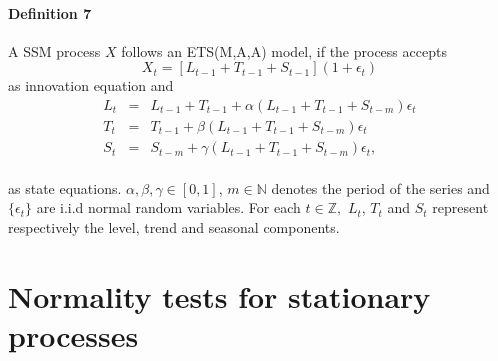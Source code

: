 \hypertarget{definition-7}{%
\paragraph{Definition 7}\label{definition-7}}

A SSM process \(X\) follows an ETS(M,A,A) model, if the process accepts\\
\[
X_t = [L_{t-1} +T_{t-1} + S_{t-1}](1 + \epsilon_t)
\]
as innovation equation and
\begin{eqnarray*}L_t &= &L_{t-1} +T_{t-1} +\alpha (L_{t-1} +T_{t-1} +S_{t-m})\epsilon_t\\
    T_t &= &T_{t-1} + \beta (L_{t-1} +T_{t-1} +S_{t-m})\epsilon_t\\
    S_t &= &S_{t-m} + \gamma (L_{t-1} +T_{t-1} +S_{t-m})\epsilon_t,
\end{eqnarray*}\\
as state equations.
\(\alpha, \beta,\gamma \in [0,1]\), \(m\in\mathbb{N}\) denotes the period of the series and \(\{\epsilon_t\}\) are i.i.d normal random variables. For each \(t\in\mathbb{Z},\) \(L_t\), \(T_t\) and \(S_t\) represent respectively the level, trend and seasonal components.

\hypertarget{normality-tests-for-stationary-processes}{%
\section{Normality tests for stationary processes}\label{normality-tests-for-stationary-processes}}

